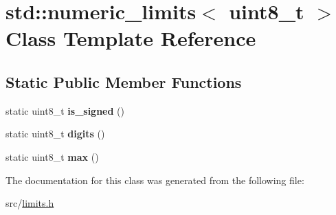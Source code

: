 \hypertarget{classstd_1_1numeric__limits_3_01uint8__t_01_4}{}\section{std\+:\+:numeric\+\_\+limits$<$ uint8\+\_\+t $>$ Class Template Reference}
\label{classstd_1_1numeric__limits_3_01uint8__t_01_4}
\subsection*{Static Public Member Functions}
\begin{DoxyCompactItemize}
\item 
\hypertarget{classstd_1_1numeric__limits_3_01uint8__t_01_4_adcbd633b68edddbf4197919ab60bb9fd}{}\label{classstd_1_1numeric__limits_3_01uint8__t_01_4_adcbd633b68edddbf4197919ab60bb9fd} 
static uint8\+\_\+t {\bfseries is\+\_\+signed} ()
\item 
\hypertarget{classstd_1_1numeric__limits_3_01uint8__t_01_4_a60652abaf60fe4ad2b9634e0281d9468}{}\label{classstd_1_1numeric__limits_3_01uint8__t_01_4_a60652abaf60fe4ad2b9634e0281d9468} 
static uint8\+\_\+t {\bfseries digits} ()
\item 
\hypertarget{classstd_1_1numeric__limits_3_01uint8__t_01_4_a08e857684300f5f5d5e973e40af90a5d}{}\label{classstd_1_1numeric__limits_3_01uint8__t_01_4_a08e857684300f5f5d5e973e40af90a5d} 
static uint8\+\_\+t {\bfseries max} ()
\end{DoxyCompactItemize}


The documentation for this class was generated from the following file\+:\begin{DoxyCompactItemize}
\item 
src/\hyperlink{limits_8h}{limits.\+h}\end{DoxyCompactItemize}
